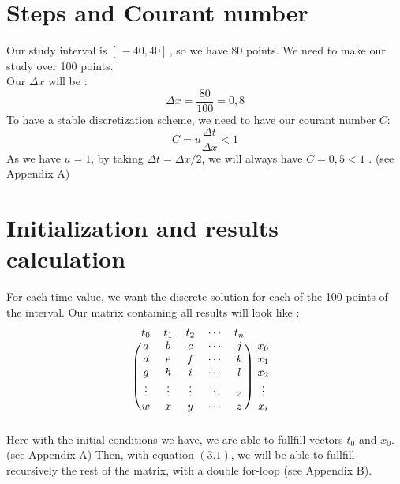 \documentclass{report}
\begin{document}
                    \section{Steps and Courant number}
                        Our study interval is $[\,-40, 40]\,$, so we have $80$ points.
                        We need to make our study over 100 points.\\
                        Our $\Delta x$ will be :
                        \vspace{2mm}
                        \[
                            \Delta x = \frac{80}{100} = 0,8
                        \]
                        To have a stable discretization scheme, we need to have our courant number $C$:
                        \vspace{2mm}
                        \[
                            C = u \frac{\Delta t}{\Delta x} < 1
                        \]
                        \vspace{2mm}
                        As we have $u = 1$, by taking $\Delta t = \Delta x / 2$, we will always have $C = 0,5 < 1$ .  (see Appendix A)

                    \section{Initialization and results calculation}

                        For each time value, we want the discrete solution for each of the 100 points of the interval.
                        Our matrix containing all results will look like :
                        \[
                            \begin{blockarray}{cccccc}
                            t_{0} & t_{1} & t_{2} & \cdots & t_{n} \\
                            \begin{block}{(ccccc)c}
                              a & b & c & \cdots & j & x_{0} \\
                              d & e & f & \cdots & k & x_{1} \\
                              g & h & i & \cdots & l & x_{2} \\
                              \vdots & \vdots & \vdots & \ddots & z & \vdots \\
                              w & x & y & \cdots & z & x_{i} \\
                            \end{block}
                            \end{blockarray}
                        \]
                        Here with the initial conditions we have, we are able to fullfill vectors $t_{0}$ and $x_{0}$. (see Appendix A)
                        Then, with equation $(3.1)$, we will be able to fullfill recursively the rest of the matrix, with a double for-loop (see Appendix B).
                        
\end{document}

